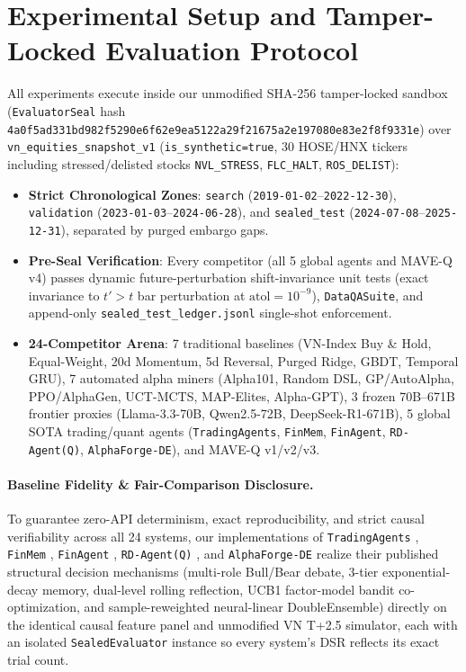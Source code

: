 \documentclass[11pt]{article}
\begin{document}
\section{Experimental Setup and Tamper-Locked Evaluation Protocol}
\label{sec:setup}
All experiments execute inside our unmodified SHA-256 tamper-locked sandbox (\texttt{EvaluatorSeal} hash \texttt{4a0f5ad331bd982f5290e6f62e9ea5122a29f21675a2e197080e83e2f8f9331e}) over \texttt{vn\_equities\_snapshot\_v1} (\texttt{is\_synthetic=true}, 30 HOSE/HNX tickers including stressed/delisted stocks \texttt{NVL\_STRESS}, \texttt{FLC\_HALT}, \texttt{ROS\_DELIST}):
\begin{itemize}[leftmargin=1.4em]
  \item \textbf{Strict Chronological Zones}: \texttt{search} (\texttt{2019-01-02}--\texttt{2022-12-30}), \texttt{validation} (\texttt{2023-01-03}--\texttt{2024-06-28}), and \texttt{sealed\_test} (\texttt{2024-07-08}--\texttt{2025-12-31}), separated by purged embargo gaps.
  \item \textbf{Pre-Seal Verification}: Every competitor (all 5 global agents and MAVE-Q v4) passes dynamic future-perturbation shift-invariance unit tests (exact invariance to $t' > t$ bar perturbation at $\text{atol}=10^{-9}$), \texttt{DataQASuite}, and append-only \texttt{sealed\_test\_ledger.jsonl} single-shot enforcement.
  \item \textbf{24-Competitor Arena}: 7 traditional baselines (VN-Index Buy \& Hold, Equal-Weight, 20d Momentum, 5d Reversal, Purged Ridge, GBDT, Temporal GRU), 7 automated alpha miners (Alpha101, Random DSL, GP/AutoAlpha, PPO/AlphaGen, UCT-MCTS, MAP-Elites, Alpha-GPT), 3 frozen 70B--671B frontier proxies (Llama-3.3-70B, Qwen2.5-72B, DeepSeek-R1-671B), 5 global SOTA trading/quant agents (\texttt{TradingAgents}, \texttt{FinMem}, \texttt{FinAgent}, \texttt{RD-Agent(Q)}, \texttt{AlphaForge-DE}), and MAVE-Q v1/v2/v3.
\end{itemize}

\paragraph{Baseline Fidelity \& Fair-Comparison Disclosure.}
To guarantee zero-API determinism, exact reproducibility, and strict causal verifiability across all 24 systems, our implementations of \texttt{TradingAgents} \citep{xiao2024tradingagents}, \texttt{FinMem} \citep{yu2024finmem}, \texttt{FinAgent} \citep{zhang2024finagent}, \texttt{RD-Agent(Q)} \citep{li2025rdagentq}, and \texttt{AlphaForge-DE} \citep{shi2025alphaforge,zhang2020doubleensemble} realize their published structural decision mechanisms (multi-role Bull/Bear debate, 3-tier exponential-decay memory, dual-level rolling reflection, UCB1 factor-model bandit co-optimization, and sample-reweighted neural-linear DoubleEnsemble) directly on the identical causal feature panel and unmodified VN T+2.5 simulator, each with an isolated \texttt{SealedEvaluator} instance so every system's DSR reflects its exact trial count.
\end{document}
